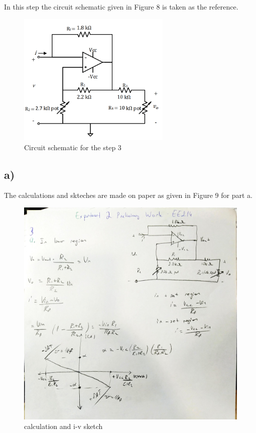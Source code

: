 \documentclass[letterpaper,12pt]{article}
\begin{document}
In this step the circuit schematic given in Figure 8 is taken as the reference.
\begin{figure}[H]
    \centering
    \includegraphics[width=0.65\textwidth]{3SCH.png}
\caption{Circuit schematic for the step 3}
\end{figure} 

\subsection{a)}
The calculations and skteches are made on paper as given in Figure 9 for part a.
\begin{figure}[H]
    \centering
    \includegraphics[width=1\textwidth]{3a.jpg}
\caption{ calculation and i-v  sketch}
\end{figure} 
\end{document}
